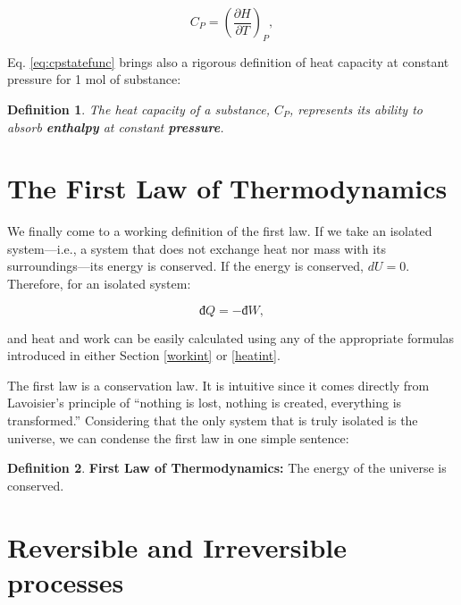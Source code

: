 \documentclass[
]{book}
\theoremstyle{definition}
\newtheorem{definition}{Definition}[chapter]
\theoremstyle{definition}
\theoremstyle{definition}
\theoremstyle{remark}
\begin{document}
\begin{equation}
  C_P = \left( \frac{\partial H} {\partial T} \right)_P,
  \label{eq:cpstatefunc}
\end{equation}

Eq. \eqref{eq:cpstatefunc} brings also a rigorous definition of heat capacity at constant pressure for 1 mol of substance:

\begin{definition}
\protect\hypertarget{def:newdefcp}{}{\label{def:newdefcp} }\emph{The heat capacity of a substance, \(C_P\), represents its ability to absorb \textbf{enthalpy} at constant \textbf{pressure}.}
\end{definition}

\hypertarget{the-first-law-of-thermodynamics}{%
\section{The First Law of Thermodynamics}\label{the-first-law-of-thermodynamics}}

We finally come to a working definition of the first law. If we take an isolated system---i.e., a system that does not exchange heat nor mass with its surroundings---its energy is conserved. If the energy is conserved, \(dU=0\). Therefore, for an isolated system:

\begin{equation}
  đ Q = -đ W,
  \label{eq:heateqwork}
\end{equation}

and heat and work can be easily calculated using any of the appropriate formulas introduced in either Section \ref{workint} or \ref{heatint}.

The first law is a conservation law. It is intuitive since it comes directly from Lavoisier's principle of ``nothing is lost, nothing is created, everything is transformed.'' Considering that the only system that is truly isolated is the universe, we can condense the first law in one simple sentence:

\begin{definition}
\protect\hypertarget{def:firstlaw}{}{\label{def:firstlaw} }\textbf{First Law of Thermodynamics:} The energy of the universe is conserved.
\end{definition}

\hypertarget{reversible-and-irreversible-processes}{%
\section{Reversible and Irreversible processes}\label{reversible-and-irreversible-processes}}
\end{document}
